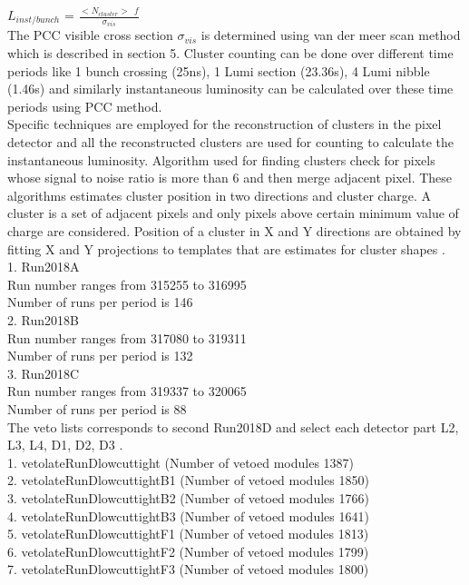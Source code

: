 $L_{inst/bunch}$ = $\frac{<N_{cluster}> \:\: f}{\sigma_{vis}}$ \\

The PCC visible cross section $\sigma_{vis}$ is determined using van der meer scan method which is described in section 5. Cluster counting can be done over different time periods like 1 bunch crossing (25ns), 1 Lumi section (23.36s), 4 Lumi nibble (1.46s) and similarly instantaneous luminosity can be calculated over these time periods using PCC method. \\

Specific techniques are employed for the reconstruction of clusters in the pixel detector and all the reconstructed clusters are used for counting to calculate the instantaneous luminosity. Algorithm used for finding clusters check for pixels whose signal to noise ratio is more than 6 and then merge adjacent pixel. These algorithms estimates cluster position in two directions and cluster charge. A cluster is a set of adjacent pixels and only pixels above certain minimum value of charge are considered. Position of a cluster in X and Y directions are obtained by fitting X and Y projections to templates that are estimates for cluster shapes \cite{Chatrchyan:2014fea}. \\



1. Run2018A \\

Run number ranges from 315255 to 316995 \\
Number of runs per period is 146 \\

2. Run2018B\\

Run number ranges from 317080 to 319311\\
Number of runs per period is 132\\

3. Run2018C\\

Run number ranges from 319337 to 320065\\
Number of runs per period is 88 \\

The veto lists corresponds to second Run2018D and select each detector part L2, L3, L4, D1, D2, D3 \cite{vetolist}. \\

1. vetolateRunDlowcuttight (Number of vetoed modules 1387) \\
2. vetolateRunDlowcuttightB1 (Number of vetoed modules 1850)\\
3. vetolateRunDlowcuttightB2 (Number of vetoed modules 1766)\\
4. vetolateRunDlowcuttightB3 (Number of vetoed modules 1641)\\
5. vetolateRunDlowcuttightF1 (Number of vetoed modules 1813)\\
6. vetolateRunDlowcuttightF2 (Number of vetoed modules 1799)\\
7. vetolateRunDlowcuttightF3 (Number of vetoed modules 1800)\\

